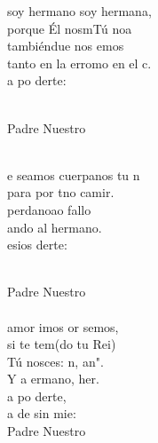 \begin{cancion}%
	 soy hermano soy  hermana,\\
	porque Él nosmTú noa\\
	tambiéndue nos emos\\
	tanto en la erromo en el c.\\
	a po derte:\\\jump\\
	\begin{chorus}%
	Padre Nuestro   \\
	\end{chorus}%
	\jump\\
	e seamos cuerpanos tu n \\
	para por tno camir.\\
	perdanoao fallo\\
	ando al hermano.\\
	esios derte:\\\jump\\
	\begin{chorus}%
	Padre Nuestro   \\
\jump\\
	 amor imos or semos,\\
	si te tem(do tu Rei)\\
	Tú nosces: n, an".  \\
	Y a ermano, her.\\
	a po derte,\\
	a de sin mie:\\
	Padre Nuestro   \\
	\end{chorus}%
	\jump\\
\end{cancion}%
